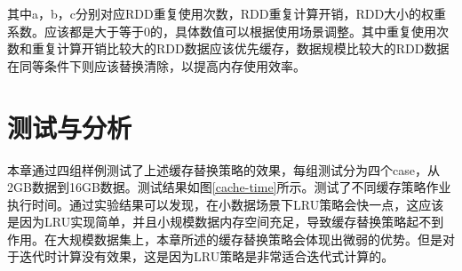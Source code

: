 其中a，b，c分别对应RDD重复使用次数，RDD重复计算开销，RDD大小的权重系数。应该都是大于等于0的，具体数值可以根据使用场景调整。其中重复使用次数和重复计算开销比较大的RDD数据应该优先缓存，数据规模比较大的RDD数据在同等条件下则应该替换清除，以提高内存使用效率。

\section{测试与分析}

本章通过四组样例测试了上述缓存替换策略的效果，每组测试分为四个case，从2GB数据到16GB数据。测试结果如图\ref{cache-time}所示。测试了不同缓存策略作业执行时间。通过实验结果可以发现，在小数据场景下LRU策略会快一点，这应该是因为LRU实现简单，并且小规模数据内存空间充足，导致缓存替换策略起不到作用。在大规模数据集上，本章所述的缓存替换策略会体现出微弱的优势。但是对于迭代时计算没有效果，这是因为LRU策略是非常适合迭代式计算的。

